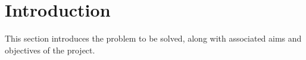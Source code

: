 \documentclass[fleqn,10pt]{SelfArx} %
\affiliation{*\textbf{Department of Computer Science, University of Bristol.}}
\affiliation{*\textbf{Repository at \url{https://github.com/smartHomeDataScience}}}
\begin{document}
\flushbottom %

\maketitle %

\thispagestyle{empty} %


\section*{Introduction} %
 
This section introduces the problem to be solved, along with associated aims and objectives of the project.
 
\end{document}
